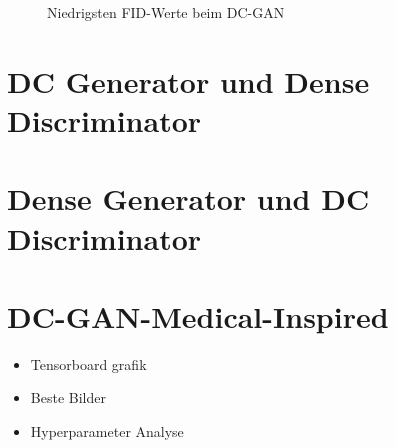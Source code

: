 \begin{figure}[H]
	\centering
	\qquad
	\qquad
	\caption{Niedrigsten FID-Werte beim DC-GAN}
	\label{ergebnis:dcgan-fid}
\end{figure}

\section{DC Generator und Dense Discriminator}

\section{Dense Generator und DC Discriminator}

\section{DC-GAN-Medical-Inspired}
\begin{itemize}
	\item Tensorboard grafik
	\item Beste Bilder
	\item Hyperparameter Analyse
\end{itemize}
